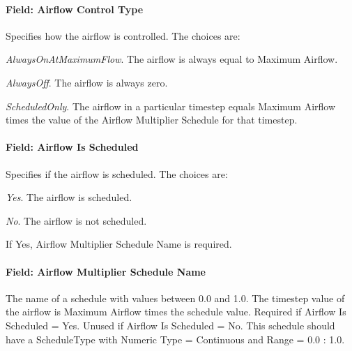 \paragraph{Field: Airflow Control Type}\label{field-airflow-control-type}

Specifies how the airflow is controlled. The choices are:

\emph{AlwaysOnAtMaximumFlow}. The airflow is always equal to Maximum Airflow.

\emph{AlwaysOff}. The airflow is always zero.

\emph{ScheduledOnly}. The airflow in a particular timestep equals Maximum Airflow times the value of the Airflow Multiplier Schedule for that timestep.

\paragraph{Field: Airflow Is Scheduled}\label{field-airflow-is-scheduled}

Specifies if the airflow is scheduled. The choices are:

\emph{Yes}. The airflow is scheduled.

\emph{No}. The airflow is not scheduled.

If Yes, Airflow Multiplier Schedule Name is required.

\paragraph{Field: Airflow Multiplier Schedule Name}\label{field-airflow-multiplier-schedule-name}

The name of a schedule with values between 0.0 and 1.0. The timestep value of the airflow is Maximum Airflow times the schedule value. Required if Airflow Is Scheduled = Yes. Unused if Airflow Is Scheduled = No. This schedule should have a ScheduleType with Numeric Type = Continuous and Range = 0.0 : 1.0.

